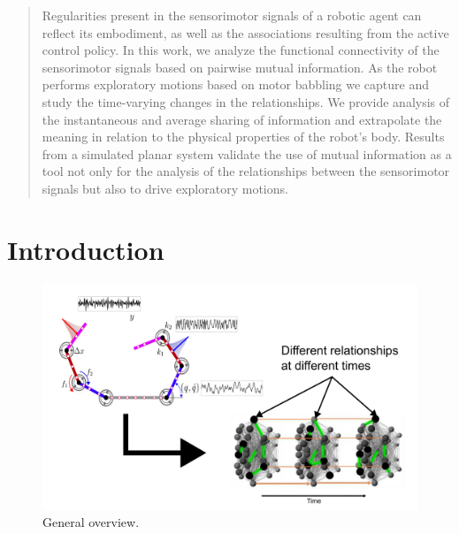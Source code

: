 \begin{abstract}
Regularities present in the sensorimotor signals of a robotic agent can reflect its embodiment, as well as the associations resulting from the active control policy. In this work, we analyze the functional connectivity of the sensorimotor signals based on pairwise mutual information. As the robot performs exploratory motions based on motor babbling we capture and study the time-varying changes in the relationships. We provide analysis of the instantaneous and average sharing of information and extrapolate the meaning in relation to the physical properties of the robot's body. Results from a simulated planar system validate the use of mutual information as a tool not only for the analysis of the relationships between the sensorimotor signals but also to drive exploratory motions.
\TODO
\end{abstract}
\section{Introduction}\label{sec:intro}
\TODO
\begin{figure}[!ht]
	\centering
	\includegraphics[width=0.9\columnwidth]{general_overview.png}
	\caption{General overview.}
	\label{fig:general_overview}
\end{figure}

